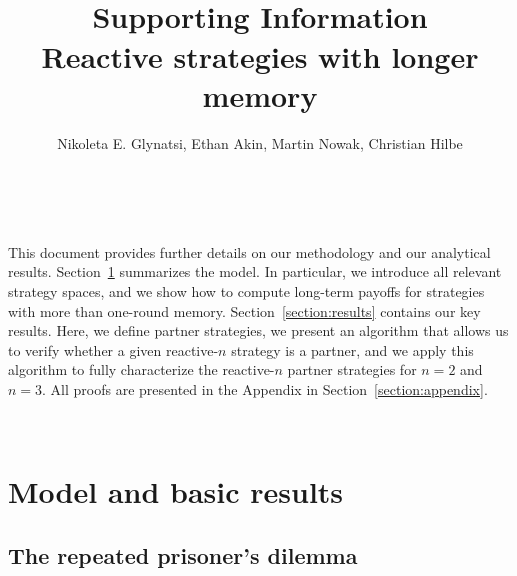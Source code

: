 \documentclass[11pt]{article}
\title{~\\[-1.5cm]{\sffamily \Large Supporting Information}\\ {\bfseries \sffamily \Large Reactive strategies with longer memory}\\[-0.3cm]}
\author{Nikoleta E. Glynatsi, Ethan Akin, Martin Nowak, Christian Hilbe}
\date{\empty}
\theoremstyle{plainCl1}
\theoremstyle{plainCl2}
\begin{document}
\maketitle

~
\noindent

\tableofcontents
 \clearpage \newpage



\noindent
This document provides further details on our methodology and our analytical
results.
Section~\ref{section:model} summarizes the model. 
In particular, we introduce all relevant strategy spaces, 
and we show how to compute long-term payoffs for strategies with more than one-round memory. 
Section~\ref{section:results} contains our key results. 
Here, we define partner strategies, we present an algorithm that allows us to verify whether a given reactive-$n$ strategy is a partner, and we apply this algorithm to fully characterize the reactive-$n$ partner strategies for $n\!=\!2$ and $n\!=\!3$.
All proofs are presented in the Appendix in Section~\ref{section:appendix}.



~\\[-1.2cm]
\section{Model and basic results}\label{section:model}

\subsection{The repeated prisoner's dilemma}

\end{document}
